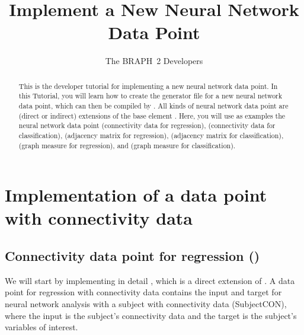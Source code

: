 \documentclass{tufte-handout}
\title{Implement a New Neural Network Data Point}
\author[The BRAPH~2 Developers]{The BRAPH~2 Developers}
\begin{document}
\maketitle

\begin{abstract}
\noindent
This is the developer tutorial for implementing a new neural network data point. 
In this Tutorial, you will learn how to create the generator file  for a new neural network data point, which can then be compiled by . All kinds of neural network data point are (direct or indirect) extensions of the base element . Here, you will use as examples the neural network data point  (connectivity data for regression),  (connectivity data for classification),  (adjacency matrix for regression),  (adjacency matrix for classification),  (graph measure for regression), and  (graph measure for classification).
\end{abstract}

\tableofcontents

\clearpage

\section{Implementation of a data point with connectivity data}

\subsection{Connectivity data point for regression ()}

We will start by implementing in detail , which is a direct extension of .
A data point for regression with connectivity data  contains the input and target for neural network analysis with a subject with connectivity data (SubjectCON), where the input is the subject's connectivity data and the target is the subject's variables of interest.
\end{document}
